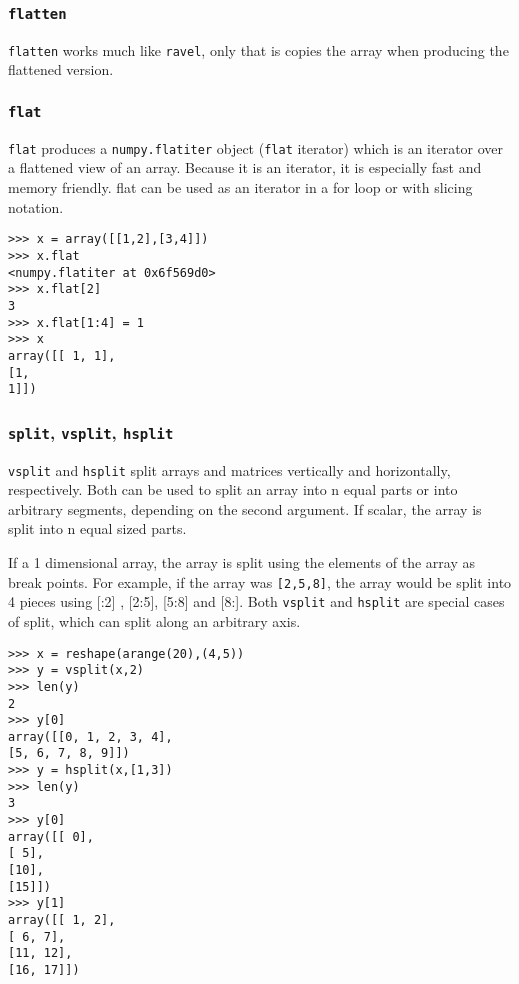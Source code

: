 \documentclass[KSmain.tex]{subfiles}
\begin{document}
\subsubsection{\texttt{flatten}}
\texttt{flatten} works much like \texttt{ravel}, only that is copies the array when producing the flattened version.

\subsubsection{\texttt{flat}}
\texttt{flat} produces a \texttt{numpy.flatiter} object (\texttt{flat} iterator) which is an iterator over a flattened view of an array.
Because it is an iterator, it is especially fast and memory friendly. flat can be used as an iterator in a for
loop or with slicing notation.
\begin{framed}
\begin{verbatim}
>>> x = array([[1,2],[3,4]])
>>> x.flat
<numpy.flatiter at 0x6f569d0>
>>> x.flat[2]
3
>>> x.flat[1:4] = 1
>>> x
array([[ 1, 1],
[1,
1]])
\end{verbatim}
\end{framed}

\subsubsection{\texttt{split}, \texttt{vsplit}, \texttt{hsplit}}
\texttt{vsplit} and \texttt{hsplit} split arrays and matrices vertically and horizontally, respectively. Both can be used to
split an array into n equal parts or into arbitrary segments, depending on the second argument. If scalar,
the array is split into n equal sized parts. 

\noindent If a 1 dimensional array, the array is split using the elements of
the array as break points. For example, if the array was \texttt{[2,5,8]}, the array would be split into 4 pieces using
[:2] , [2:5], [5:8] and [8:]. Both \texttt{vsplit} and \texttt{hsplit} are special cases of split, which can split along an
arbitrary axis.
\begin{framed}
\begin{verbatim}
>>> x = reshape(arange(20),(4,5))
>>> y = vsplit(x,2)
>>> len(y)
2
>>> y[0]
array([[0, 1, 2, 3, 4],
[5, 6, 7, 8, 9]])
>>> y = hsplit(x,[1,3])
>>> len(y)
3
>>> y[0]
array([[ 0],
[ 5],
[10],
[15]])
>>> y[1]
array([[ 1, 2],
[ 6, 7],
[11, 12],
[16, 17]])
\end{verbatim}
\end{framed}
\end{document}
